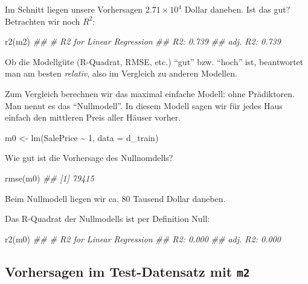 \documentclass[
  letterpaper,
  oneside,
  open=any]{scrbook}
\newenvironment{Shaded}{\begin{snugshade}}{\end{snugshade}}
\newcommand{\AttributeTok}[1]{\textcolor[rgb]{0.40,0.45,0.13}{#1}}
\newcommand{\DecValTok}[1]{\textcolor[rgb]{0.68,0.00,0.00}{#1}}
\newcommand{\DocumentationTok}[1]{\textcolor[rgb]{0.37,0.37,0.37}{\textit{#1}}}
\newcommand{\FunctionTok}[1]{\textcolor[rgb]{0.28,0.35,0.67}{#1}}
\newcommand{\NormalTok}[1]{\textcolor[rgb]{0.00,0.23,0.31}{#1}}
\newcommand{\OtherTok}[1]{\textcolor[rgb]{0.00,0.23,0.31}{#1}}
\newcommand{\SpecialCharTok}[1]{\textcolor[rgb]{0.37,0.37,0.37}{#1}}
\theoremstyle{definition}
\theoremstyle{definition}
\theoremstyle{definition}
\theoremstyle{remark}
\begin{document}
Im Schnitt liegen unsere Vorhersagen \ensuremath{2.71\times 10^{4}}
Dollar daneben. Ist das gut? Betrachten wir noch \(R^2\):

\begin{Shaded}
\begin{Highlighting}[]
\FunctionTok{r2}\NormalTok{(m2)}
\DocumentationTok{\#\# \# R2 for Linear Regression}
\DocumentationTok{\#\#        R2: 0.739}
\DocumentationTok{\#\#   adj. R2: 0.739}
\end{Highlighting}
\end{Shaded}

Ob die Modellgüte (R-Quadrat, RMSE, etc.) \enquote{gut} bzw.
\enquote{hoch} ist, beantwortet man am besten \emph{relativ}, also im
Vergleich zu anderen Modellen.

Zum Vergleich berechnen wir das maximal einfache Modell: ohne
Prädiktoren. Man nennt es das \enquote{Nullmodell}. In diesem Modell
sagen wir für jedes Haus einfach den mittleren Preis aller Häuser
vorher.

\begin{Shaded}
\begin{Highlighting}[]
\NormalTok{m0 }\OtherTok{\textless{}{-}} \FunctionTok{lm}\NormalTok{(SalePrice }\SpecialCharTok{\textasciitilde{}} \DecValTok{1}\NormalTok{, }\AttributeTok{data =}\NormalTok{ d\_train)}
\end{Highlighting}
\end{Shaded}

Wie gut ist die Vorhersage des Nullnomdells?

\begin{Shaded}
\begin{Highlighting}[]
\FunctionTok{rmse}\NormalTok{(m0)}
\DocumentationTok{\#\# [1] 79415}
\end{Highlighting}
\end{Shaded}

Beim Nullmodell liegen wir ca. 80 Tausend Dollar daneben.

Das R-Quadrat der Nullmodells ist per Definition Null:

\begin{Shaded}
\begin{Highlighting}[]
\FunctionTok{r2}\NormalTok{(m0)}
\DocumentationTok{\#\# \# R2 for Linear Regression}
\DocumentationTok{\#\#        R2: 0.000}
\DocumentationTok{\#\#   adj. R2: 0.000}
\end{Highlighting}
\end{Shaded}

\subsection{\texorpdfstring{Vorhersagen im Test-Datensatz mit
\texttt{m2}}{Vorhersagen im Test-Datensatz mit m2}}\label{vorhersagen-im-test-datensatz-mit-m2}
\end{document}

